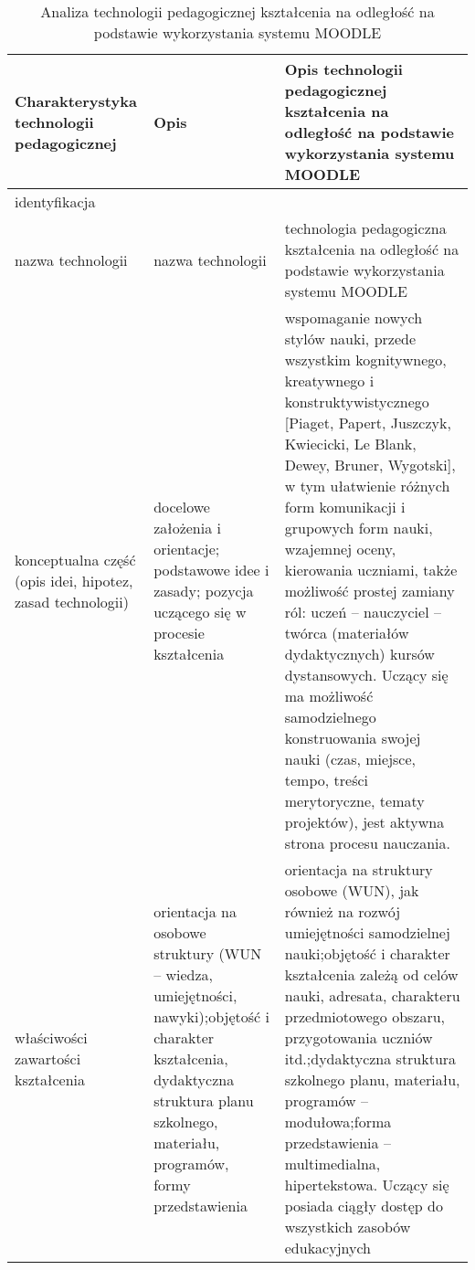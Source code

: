 	\begin{table}[!h]
		\centering
		\caption[Analiza technologii pedagogicznej w Moodle'u]{Analiza technologii pedagogicznej kształcenia na odległość na podstawie wykorzystania systemu MOODLE}
		\label{tab:pedagogika}
		\begin{tabular}{|p{4cm}|p{4cm}|p{9cm}|} \hline
			 \textbf{Charakterystyka technologii pedagogicznej} & \textbf{Opis} & \textbf{Opis technologii pedagogicznej
kształcenia na odległość na podstawie
wykorzystania systemu MOODLE} \\ \hline
			identyfikacja & & \\ \hline
			nazwa technologii & nazwa technologii & technologia pedagogiczna kształcenia na odległość na podstawie wykorzystania systemu MOODLE \\ \hline
			konceptualna część (opis idei, hipotez, zasad technologii) & docelowe założenia i orientacje; podstawowe idee i zasady; pozycja uczącego się w procesie kształcenia & wspomaganie nowych stylów nauki, przede wszystkim kognitywnego, kreatywnego i konstruktywistycznego [Piaget, Papert, Juszczyk, Kwiecicki, Le Blank, Dewey, Bruner, Wygotski], w tym ułatwienie różnych form komunikacji i grupowych form nauki, wzajemnej oceny, kierowania uczniami, także możliwość prostej zamiany ról: uczeń – nauczyciel – twórca (materiałów dydaktycznych) kursów dystansowych. Uczący się ma możliwość samodzielnego konstruowania swojej nauki (czas, miejsce, tempo, treści merytoryczne, tematy projektów), jest aktywna strona procesu nauczania. \\ \hline
		właściwości zawartości kształcenia & orientacja na osobowe struktury (WUN – wiedza, umiejętności, nawyki);\newline objętość i charakter kształcenia, dydaktyczna struktura planu szkolnego, materiału, programów, formy przedstawienia & orientacja na struktury osobowe (WUN), jak również na rozwój umiejętności samodzielnej nauki;\newline objętość i charakter kształcenia zależą od celów nauki, adresata, charakteru przedmiotowego obszaru, przygotowania uczniów itd.;\newline dydaktyczna struktura szkolnego planu, materiału, programów – modułowa;\newline forma przedstawienia – multimedialna, hipertekstowa. Uczący się posiada ciągły dostęp do wszystkich zasobów edukacyjnych \\ \hline
		\end{tabular}
	\end{table}

